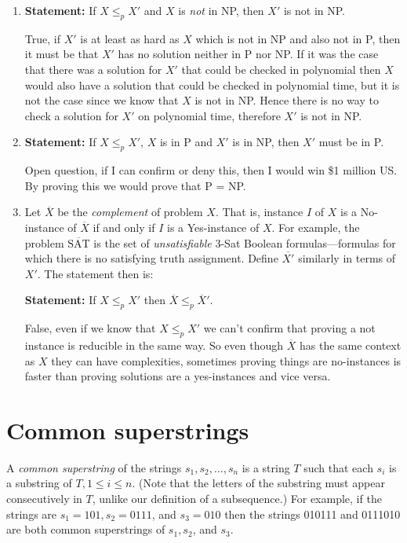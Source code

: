 \documentclass[11pt]{article}
\def\soln#1{\par\blu{#1}} %
\def\blu#1{{\color{blu}#1}}
\begin{document}
\begin{enumerate}
\item \textbf{Statement:}
   If $X \le_p X'$ and $X$ is \emph{not} in NP, then $X'$ is not in NP.
\soln{
   True, if $X'$ is at least as hard as $X$ which is not in NP and also not in P, then it must be that 
   $X'$ has no solution neither in P nor NP. If it was the case that there was a solution for 
   $X'$ that could be checked in polynomial then $X$ would also have a solution that could be checked 
   in polynomial time, but it is not the case since we know that $X$ is not in NP. Hence there is no 
   way to check a solution for $X'$ on polynomial time, therefore $X'$ is not in NP.
}
\item \textbf{Statement:}
If $X \le_p X'$, $X$ is in P and $X'$ is in NP, then $X'$ must be in P.
\soln{
   Open question, if I can confirm or deny this, then I would win \$1 million US. By proving this 
   we would prove that P = NP.
}

\item Let
$\overline{X}$ be the \emph{complement} of problem $X$. That is,
instance $I$ of $X$ is a No-instance of $\overline{X}$ if and only
if $I$ is a Yes-instance of $X$. 
For example, the problem $\overline{\mbox{SAT}}$
is the set of \emph{unsatisfiable} 3-Sat Boolean formulas---formulas
for which there is no satisfying truth assignment.
Define $\overline{X'}$ similarly in terms of $X'$. The statement then is:

\textbf{Statement:} If $X \le_p X'$ then $\overline{X} \le_p \overline{X}'$.
\soln{
   False, even if we know that $X \le_p X'$ we can't confirm that proving a not instance is reducible 
   in the same way. So even though $\overline{X}$  has the same context as $X$ they can have complexities, 
   sometimes proving things are no-instances is faster than proving solutions are a yes-instances and 
   vice versa.
}
\end{enumerate}

\section{Common superstrings}
\label{sec-3}
A \emph{common superstring} of the strings $s_1, s_2, \ldots, s_n$ is a
string $T$ such that each $s_i$ is a substring of $T, 1 \le i \le
n$. (Note that the letters of the substring must appear consecutively in
$T$, unlike our definition of a subsequence.) For example, if the
strings are $s_1 = 101, s_2 = 0111$, and $s_3 = 010$ then the strings
010111 and 0111010 are both common superstrings of $s_1, s_2$, and
$s_3$.  
\end{document}
